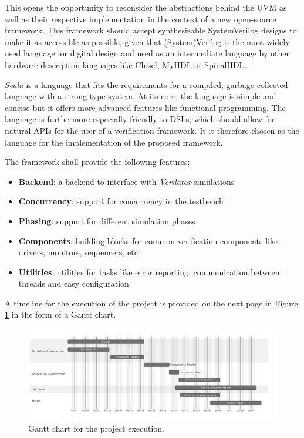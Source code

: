 \documentclass[11pt]{article}
\begin{document}
This opens the opportunity to reconsider the abstractions behind the UVM as well as their respective implementation in the context of a new open-source framework. This framework should accept synthesizable SystemVerilog designs to make it as accessible as possible, given that (System)Verilog is the most widely used language for digital design and used as an intermediate language by other hardware description languages like Chisel, MyHDL or SpinalHDL.

\textit{Scala} is a language that fits the requirements for a compiled, garbage-collected language with a strong type system. At its core, the language is simple and concise but it offers more advanced features like functional programming. The language is furthermore especially friendly to DSLs, which should allow for natural APIs for the user of a verification framework. It it therefore chosen as the language for the implementation of the proposed framework.


\noindent The framework shall provide the following features:

\begin{itemize}
    \item \textbf{Backend}: a backend to interface with \textit{Verilator} simulations
    \item \textbf{Concurrency}: support for concurrency in the testbench
    \item \textbf{Phasing}: support for different simulation phases
    \item \textbf{Components}: building blocks for common verification components like drivers, monitors, sequencers, etc.
    \item \textbf{Utilities}: utilities for tasks like error reporting, communication between threads and easy configuration
\end{itemize}


\noindent A timeline for the execution of the project is provided on the next page in Figure \ref{fig:gantt} in the form of a Gantt chart.

\begin{landscape}
    \pagestyle{empty}%
    \begin{figure}
        \hspace{-2.5cm}
        \includegraphics[width=24cm]{gantt.pdf}
        \caption{Gantt chart for the project execution.}
        \label{fig:gantt}
\end{figure}
\end{landscape}


\printbibliography
\end{document}
